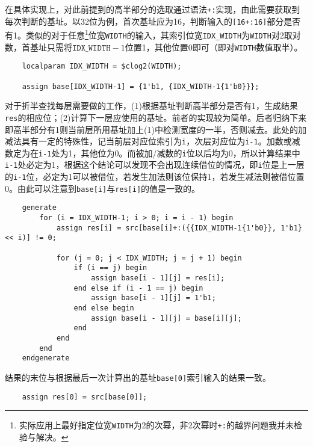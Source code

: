 \documentclass[UTF-8,twoside,c5size]{ctexart}
\begin{document}
    在具体实现上，对此前提到的高半部分的选取通过语法\texttt{+:}实现，由此需要获取到每次判断的基址。以32位为例，首次基址应为16，判断输入的\texttt{[16+:16]}部分是否有1。类似的对于任意\footnote{实际应用上最好指定位宽\texttt{WIDTH}为2的次幂，非2次幂时\texttt{+:}的越界问题我并未检验与解决。}位宽\texttt{WIDTH}的输入，其索引位宽\texttt{IDX\_WIDTH}为\texttt{WIDTH}对2取对数，首基址只需将$ \mathtt{IDX\_WIDTH}-1 $位置1，其他位置0即可（即对\texttt{WIDTH}数值取半）。
    
    \begin{verbatim}
    localparam IDX_WIDTH = $clog2(WIDTH);
    
    assign base[IDX_WIDTH-1] = {1'b1, {IDX_WIDTH-1{1'b0}}};
    \end{verbatim}
    
    对于折半查找每层需要做的工作，(1)根据基址判断高半部分是否有1，生成结果\texttt{res}的相应位；(2)计算下一层应使用的基址。前者的实现较为简单。后者归纳下来即高半部分有1则当前层所用基址加上(1)中检测宽度的一半，否则减去。此处的加减法具有一定的特殊性，记当前层对应位索引为\texttt{i}，次层对应位为\texttt{i-1}。加数或减数定为在\texttt{i-1}处为1，其他位为0。而被加/减数的\texttt{i}位以后均为0，所以计算结果中\texttt{i-1}处必定为1，根据这个结论可以发现不会出现连续借位的情况，即\texttt{i}位是上一层的\texttt{i-1}位，必定为1可以被借位，若发生加法则该位保持1，若发生减法则被借位置0。由此可以注意到\texttt{base[i]}与\texttt{res[i]}的值是一致的。
    
    \begin{verbatim}
    generate 
        for (i = IDX_WIDTH-1; i > 0; i = i - 1) begin
            assign res[i] = src[base[i]+:({{IDX_WIDTH-1{1'b0}}, 1'b1} << i)] != 0;
            
            for (j = 0; j < IDX_WIDTH; j = j + 1) begin
                if (i == j) begin
                    assign base[i - 1][j] = res[i];
                end else if (i - 1 == j) begin
                    assign base[i - 1][j] = 1'b1;
                end else begin
                    assign base[i - 1][j] = base[i][j]; 
                end                
            end
        end
    endgenerate
    \end{verbatim}
    
    结果的末位与根据最后一次计算出的基址\texttt{base[0]}索引输入的结果一致。
    
    \begin{verbatim}
    assign res[0] = src[base[0]];
    \end{verbatim}
    
\end{document}

